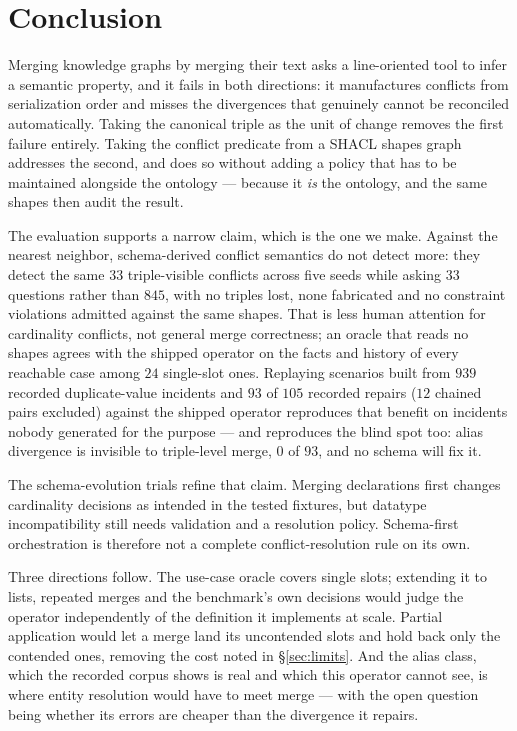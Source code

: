 \section{Conclusion}

Merging knowledge graphs by merging their text asks a line-oriented tool to
infer a semantic property, and it fails in both directions: it manufactures
conflicts from serialization order and misses the divergences that genuinely
cannot be reconciled automatically. Taking the canonical triple as the unit of
change removes the first failure entirely. Taking the conflict predicate from a
SHACL shapes graph addresses the second, and does so without adding a policy
that has to be maintained alongside the ontology --- because it \emph{is} the
ontology, and the same shapes then audit the result.

The evaluation supports a narrow claim, which is the one we make. Against the
nearest neighbor, schema-derived conflict semantics do not detect more: they
detect the same $33$ triple-visible conflicts across five seeds while asking
$33$ questions rather than $845$, with no triples lost, none fabricated and no
constraint violations admitted against the same shapes. That is less human
attention for cardinality conflicts, not general merge correctness; an oracle that reads no shapes agrees with
the shipped operator on the facts and history of every reachable case among $24$ single-slot ones. Replaying scenarios built from $939$ recorded duplicate-value incidents and
$93$ of $105$ recorded repairs ($12$ chained pairs excluded) against the shipped
operator reproduces that benefit on incidents nobody generated for the purpose --- and reproduces the blind spot too:
alias divergence is invisible to triple-level merge, $0$ of $93$, and no schema
will fix it.

The schema-evolution trials refine that claim.
Merging declarations first changes cardinality decisions as intended in the
tested fixtures, but datatype incompatibility still needs validation and a
resolution policy. Schema-first orchestration is therefore not a complete
conflict-resolution rule on its own.

Three directions follow. The use-case oracle covers single slots; extending it
to lists, repeated merges and the benchmark's own decisions would judge the
operator independently of the definition it implements at scale.
Partial application would let a merge land its
uncontended slots and hold back only the contended ones, removing the cost
noted in \S\ref{sec:limits}. And the alias class, which the recorded corpus shows is real
and which this operator cannot see, is where entity resolution would have
to meet merge --- with the open question being whether its errors are cheaper
than the divergence it repairs.
